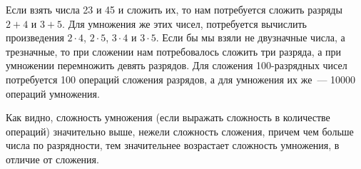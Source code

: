 Если взять числа 23 и 45 и сложить их, то нам потребуется сложить разряды $2+4$ и $3+5$. Для умножения же этих чисел, потребуется вычислить произведения $2\cdot 4$, $2\cdot 5$, $3\cdot 4$ и $3\cdot 5$. Если бы мы взяли не двузначные числа, а трезначные, то при сложении нам потребовалось сложить три разряда, а при умножении перемножить девять разрядов. Для сложения 100-разрядных чисел потребуется 100 операций сложения разрядов, а для умножения их же~--- 10000 операций умножения.

Как видно, сложность умножения (если выражать сложность в количестве операций)  значительно выше, нежели сложность сложения, причем чем больше числа по разрядности, тем значительнее возрастает сложность умножения, в отличие от сложения.

